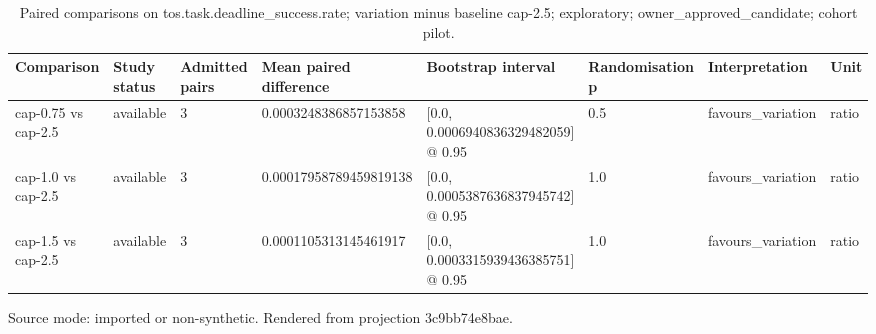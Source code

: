 {
\begin{table}[htbp]
\centering
\caption{Paired comparisons on tos.task.deadline\_success.rate; variation minus baseline cap-2.5; exploratory; owner\_approved\_candidate; cohort pilot.}
\label{tab:traffictwin-statistical-study-3c9bb74e8bae}
\small
\renewcommand{\arraystretch}{1.15}
\begin{tabular}{llllllll}
\hline
Comparison & Study status & Admitted pairs & Mean paired difference & Bootstrap interval & Randomisation p & Interpretation & Unit \\
\hline
cap-0.75 vs cap-2.5 & available & 3 & 0.0003248386857153858 & [0.0, 0.0006940836329482059] @ 0.95 & 0.5 & favours\_variation & ratio \\
cap-1.0 vs cap-2.5 & available & 3 & 0.00017958789459819138 & [0.0, 0.0005387636837945742] @ 0.95 & 1.0 & favours\_variation & ratio \\
cap-1.5 vs cap-2.5 & available & 3 & 0.0001105313145461917 & [0.0, 0.0003315939436385751] @ 0.95 & 1.0 & favours\_variation & ratio \\
\hline
\end{tabular}
\par\footnotesize
Source mode: imported or non-synthetic.
Rendered from projection 3c9bb74e8bae.
\end{table}
}
